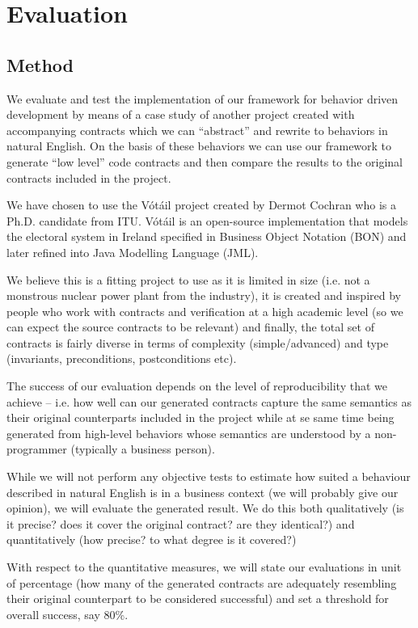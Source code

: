 \section{Evaluation}
\subsection{Method}

We evaluate and test the implementation of our framework for behavior driven development by means of a case study of another project created with accompanying contracts which we can ``abstract'' and rewrite to behaviors in natural English. On the basis of these behaviors we can use our framework to generate ``low level'' code contracts and then compare the results to the original contracts included in the project.
 
We have chosen to use the V\'{o}t\'{a}il project created by Dermot Cochran who is a Ph.D. candidate from ITU. V\'{o}t\'{a}il is an open-source implementation that models the electoral system in Ireland specified in Business Object Notation (BON) and later refined into Java Modelling Language (JML).
 
We believe this is a fitting project to use as it is limited in size (i.e. not a monstrous nuclear power plant from the industry), it is created and inspired by people who work with contracts and verification at a high academic level (so we can expect the source contracts to be relevant) and finally, the total set of contracts is fairly diverse in terms of complexity (simple/advanced) and type (invariants, preconditions, postconditions etc).
 
The success of our evaluation depends on the level of reproducibility that we achieve – i.e. how well can our generated contracts capture the same semantics as their original counterparts included in the project while at se same time being generated from high-level behaviors whose semantics are understood by a non-programmer (typically a business person).
 
While we will not perform any objective tests to estimate how suited a behaviour described in natural English is in a business context (we will probably give our opinion), we will evaluate the generated result. We do this both qualitatively (is it precise? does it cover the original contract? are they identical?) and quantitatively (how precise? to what degree is it covered?)
 
With respect to the quantitative measures, we will state our evaluations in unit of percentage (how many of the generated contracts are adequately resembling their original counterpart to be considered successful) and set a threshold for overall success, say 80\%.